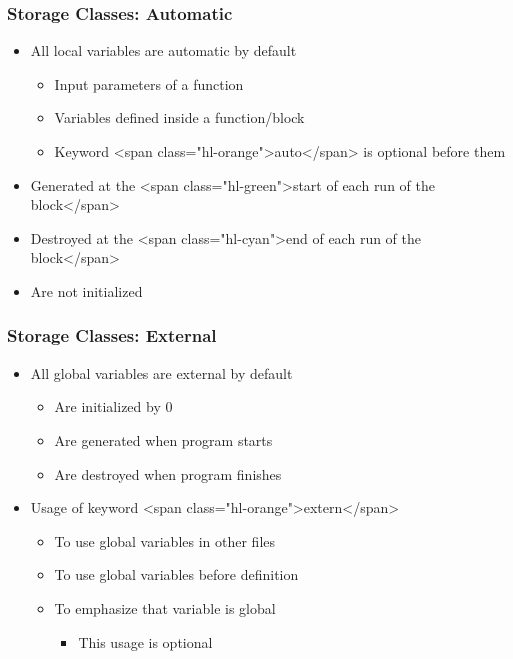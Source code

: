 \documentclass{../c-lecture}
\begin{document}
\begin{frame}
  \frametitle{Storage Classes: Automatic}
  \begin{itemize}
    \item All local variables are automatic by default
    \begin{itemize}
      \item Input parameters of a function
      \item Variables defined inside a function/block
      \item
        Keyword <span class="hl-orange">auto</span> is optional before them
    \end{itemize}
    \item
      Generated at the
      <span class="hl-green">start of each run of the block</span>

    \item
      Destroyed at the
      <span class="hl-cyan">end of each run of the block</span>

    \item Are not initialized
  \end{itemize}
\end{frame}

\begin{frame}
  \frametitle{Storage Classes: External}
  \begin{itemize}
    \item All global variables are external by default
    \begin{itemize}
      \item Are initialized by 0
      \item Are generated when program starts
      \item Are destroyed when program finishes
    \end{itemize}
    \item Usage of keyword <span class="hl-orange">extern</span>
    \begin{itemize}
      \item To use global variables in other files
      \item To use global variables before definition
      \item To emphasize that variable is global
      \begin{itemize}
        \item This usage is optional
      \end{itemize}
    \end{itemize}
  \end{itemize}
\end{frame}
\end{document}
